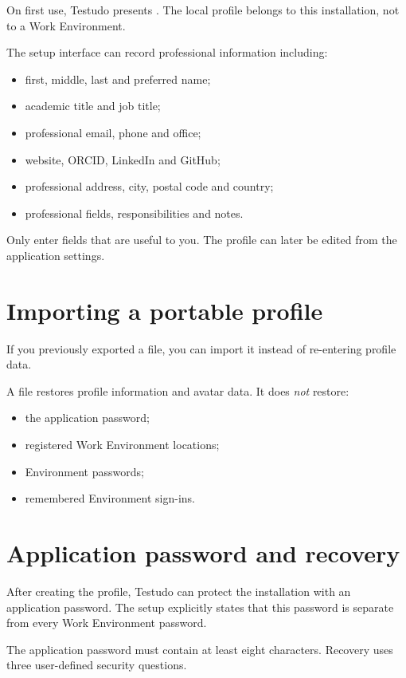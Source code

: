 \documentclass{testudomanual}
\begin{document}
On first use, Testudo presents . The local profile belongs to this installation, not to a Work Environment.

The setup interface can record professional information including:
\begin{itemize}
    \item first, middle, last and preferred name;
    \item academic title and job title;
    \item professional email, phone and office;
    \item website, ORCID, LinkedIn and GitHub;
    \item professional address, city, postal code and country;
    \item professional fields, responsibilities and notes.
\end{itemize}

Only enter fields that are useful to you. The profile can later be edited from the application settings.

\section{Importing a portable profile}

If you previously exported a  file, you can import it instead of re-entering profile data.

A  file restores profile information and avatar data. It does \emph{not} restore:
\begin{itemize}
    \item the application password;
    \item registered Work Environment locations;
    \item Environment passwords;
    \item remembered Environment sign-ins.
\end{itemize}

\section{Application password and recovery}

After creating the profile, Testudo can protect the installation with an application password. The setup explicitly states that this password is separate from every Work Environment password.

The application password must contain at least eight characters. Recovery uses three user-defined security questions.
\end{document}
